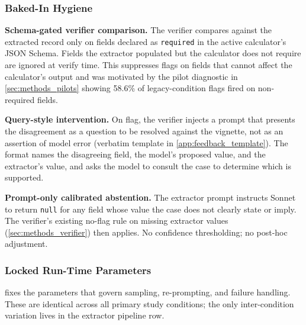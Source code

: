 \subsubsection{Baked-In Hygiene}

\textbf{Schema-gated verifier comparison.} The verifier compares
 against the extracted record
only on fields declared as \texttt{required} in the active
calculator's JSON Schema. Fields the extractor populated but the
calculator does not require are ignored at verify time. This
suppresses flags on fields that cannot affect the calculator's
output and was motivated by the pilot diagnostic in
\cref{sec:methods_pilots} showing 58.6\% of legacy-condition flags
fired on non-required fields.

\textbf{Query-style intervention.} On flag, the verifier injects a
prompt that presents the disagreement as a question to be resolved
against the vignette, not as an assertion of model error (verbatim
template in \cref{app:feedback_template}). The format names the
disagreeing field, the model's proposed value, and the extractor's
value, and asks the model to consult the case to determine which is
supported.

\textbf{Prompt-only calibrated abstention.} The extractor prompt
instructs Sonnet to return \texttt{null} for any field whose value
the case does not clearly state or imply. The verifier's existing
no-flag rule on missing extractor values
(\cref{sec:methods_verifier}) then applies. No confidence
thresholding; no post-hoc adjustment.

\subsubsection{Locked Run-Time Parameters}

 fixes the parameters that govern sampling,
re-prompting, and failure handling. These are identical across all
primary study conditions; the only inter-condition variation lives
in the extractor pipeline row.


